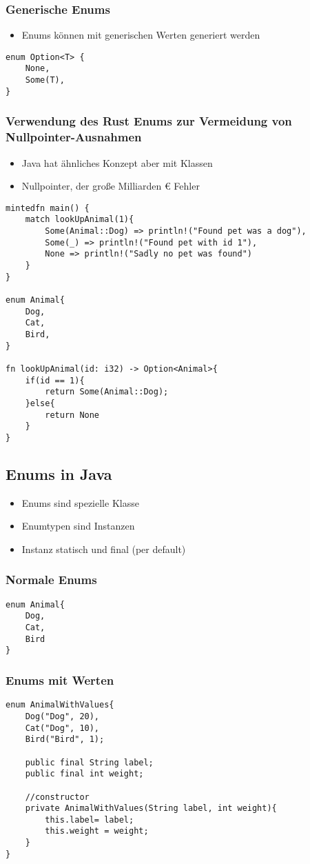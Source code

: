 \documentclass[a4paper, 1ppt]{article}
\begin{document}
\subsubsection{Generische Enums}
\begin{itemize}
	\item Enums können mit generischen Werten generiert werden
\end{itemize}
\begin{verbatim}
enum Option<T> {
	None,
	Some(T),
}
\end{verbatim}
\subsubsection{Verwendung des Rust Enums zur Vermeidung von Nullpointer-Ausnahmen}
\begin{itemize}
	\item Java hat ähnliches Konzept aber mit Klassen
	\item Nullpointer, der große Milliarden € Fehler
\end{itemize}
\begin{verbatim}
mintedfn main() {
    match lookUpAnimal(1){
        Some(Animal::Dog) => println!("Found pet was a dog"),
        Some(_) => println!("Found pet with id 1"),
        None => println!("Sadly no pet was found")
    }
}

enum Animal{
    Dog,
    Cat,
    Bird,
}

fn lookUpAnimal(id: i32) -> Option<Animal>{
    if(id == 1){
        return Some(Animal::Dog);
    }else{
        return None
    }
}
\end{verbatim}
\subsection{Enums in Java}
\begin{itemize}
	\item Enums sind spezielle Klasse
	\item Enumtypen sind Instanzen
	\item Instanz statisch und final (per default)
\end{itemize}
\subsubsection{Normale Enums}
\begin{verbatim}
enum Animal{
    Dog,
    Cat,
    Bird
}
\end{verbatim}
\subsubsection{Enums mit Werten}
\begin{verbatim}
enum AnimalWithValues{
    Dog("Dog", 20),
    Cat("Dog", 10),
    Bird("Bird", 1);

    public final String label;
    public final int weight;

    //constructor
    private AnimalWithValues(String label, int weight){
        this.label= label;
        this.weight = weight;
    }
}
\end{verbatim}
\end{document}
